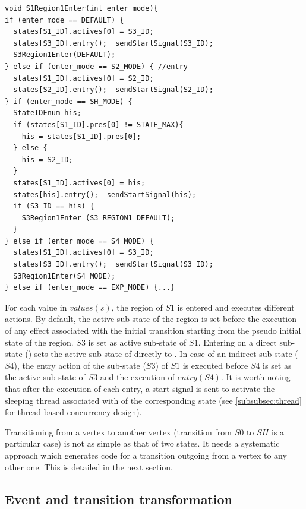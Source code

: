   

\begin{lstlisting}[caption=Example code generated for the region of S1, label=lst:region, frame=single]
void S1Region1Enter(int enter_mode){
if (enter_mode == DEFAULT) {
  states[S1_ID].actives[0] = S3_ID;
  states[S3_ID].entry();  sendStartSignal(S3_ID);
  S3Region1Enter(DEFAULT);
} else if (enter_mode == S2_MODE) { //entry
  states[S1_ID].actives[0] = S2_ID;
  states[S2_ID].entry();  sendStartSignal(S2_ID);
} if (enter_mode == SH_MODE) {
  StateIDEnum his;
  if (states[S1_ID].pres[0] != STATE_MAX){
    his = states[S1_ID].pres[0];
  } else {
    his = S2_ID;
  }
  states[S1_ID].actives[0] = his;
  states[his].entry();  sendStartSignal(his);
  if (S3_ID == his) {
    S3Region1Enter (S3_REGION1_DEFAULT);
  } 
} else if (enter_mode == S4_MODE) {
  states[S1_ID].actives[0] = S3_ID;
  states[S3_ID].entry();  sendStartSignal(S3_ID);
  S3Region1Enter(S4_MODE);
} else if (enter_mode == EXP_MODE) {...}
\end{lstlisting}

For each value in $values(s)$, the region of $S1$ is entered and executes different actions. By default, the active sub-state of the region is set before the execution of any effect associated with the initial transition starting from the pseudo initial state of the region. $S3$ is set as active sub-state of $S1$. Entering on a direct sub-state () sets the active sub-state of  directly to . In case of an indirect sub-state ($S4$), the entry action of the sub-state ($S3$) of $S1$ is executed before $S4$ is set as the active-sub state of $S3$ and the execution of $entry(S4)$. It is worth noting that after the execution of each entry, a start signal is sent to activate the sleeping thread associated with  of the corresponding state (see \ref{subsubsec:thread} for thread-based concurrency design).

Transitioning from a vertex to another vertex (transition from $S0$ to $SH$ is a particular case) is not as simple as that of two states. It needs a systematic approach which generates code for a transition outgoing from a vertex to any other one. This is detailed in the next section.

\subsection{Event and transition transformation}
\label{subsec:event}
